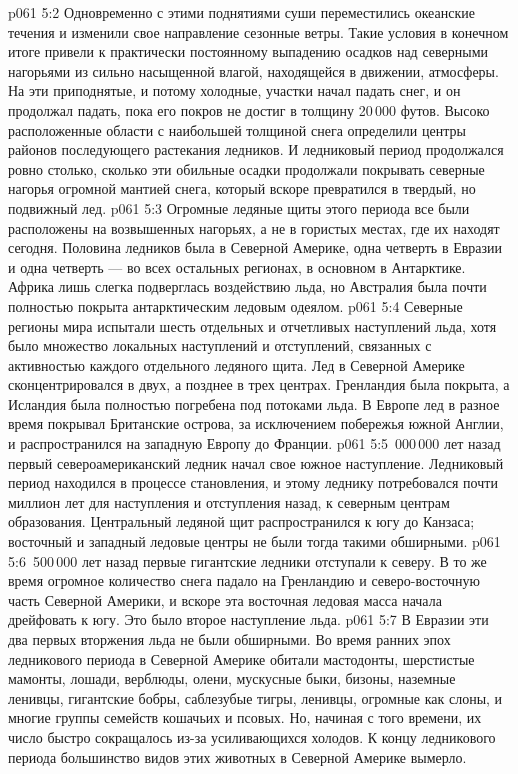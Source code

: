 \vs p061 5:2 Одновременно с этими поднятиями суши переместились океанские течения и изменили свое направление сезонные ветры. Такие условия в конечном итоге привели к практически постоянному выпадению осадков над северными нагорьями из сильно насыщенной влагой, находящейся в движении, атмосферы. На эти приподнятые, и потому холодные, участки начал падать снег, и он продолжал падать, пока его покров не достиг в толщину 20\,000 футов. Высоко расположенные области с наибольшей толщиной снега определили центры районов последующего растекания ледников. И ледниковый период продолжался ровно столько, сколько эти обильные осадки продолжали покрывать северные нагорья огромной мантией снега, который вскоре превратился в твердый, но подвижный лед.
\vs p061 5:3 Огромные ледяные щиты этого периода все были расположены на возвышенных нагорьях, а не в гористых местах, где их находят сегодня. Половина ледников была в Северной Америке, одна четверть в Евразии и одна четверть --- во всех остальных регионах, в основном в Антарктике. Африка лишь слегка подверглась воздействию льда, но Австралия была почти полностью покрыта антарктическим ледовым одеялом.
\vs p061 5:4 Северные регионы мира испытали шесть отдельных и отчетливых наступлений льда, хотя было множество локальных наступлений и отступлений, связанных с активностью каждого отдельного ледяного щита. Лед в Северной Америке сконцентрировался в двух, а позднее в трех центрах. Гренландия была покрыта, а Исландия была полностью погребена под потоками льда. В Европе лед в разное время покрывал Британские острова, за исключением побережья южной Англии, и распространился на западную Европу до Франции.
\vs p061 5:5 \,000\,000 лет назад первый североамериканский ледник начал свое южное наступление. Ледниковый период находился в процессе становления, и этому леднику потребовался почти миллион лет для наступления и отступления назад, к северным центрам образования. Центральный ледяной щит распространился к югу до Канзаса; восточный и западный ледовые центры не были тогда такими обширными.
\vs p061 5:6 \,500\,000 лет назад первые гигантские ледники отступали к северу. В то же время огромное количество снега падало на Гренландию и северо\hyp{}восточную часть Северной Америки, и вскоре эта восточная ледовая масса начала дрейфовать к югу. Это было второе наступление льда.
\vs p061 5:7 В Евразии эти два первых вторжения льда не были обширными. Во время ранних эпох ледникового периода в Северной Америке обитали мастодонты, шерстистые мамонты, лошади, верблюды, олени, мускусные быки, бизоны, наземные ленивцы, гигантские бобры, саблезубые тигры, ленивцы, огромные как слоны, и многие группы семейств кошачьих и псовых. Но, начиная с того времени, их число быстро сокращалось из\hyp{}за усиливающихся холодов. К концу ледникового периода большинство видов этих животных в Северной Америке вымерло.
